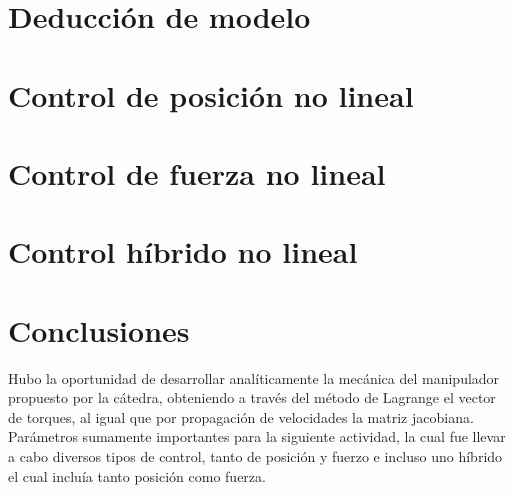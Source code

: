 




\setmainfont{AvenirLTStd-Roman}



\setmainfont{Calibri}


\tableofcontents
\newpage


\section{Deducción de modelo}


\section{Control de posición no lineal}


\section{Control de fuerza no lineal}


\section{Control híbrido no lineal}


\section{Conclusiones}
Hubo la oportunidad de desarrollar analíticamente la mecánica del manipulador propuesto por la cátedra, obteniendo a través del método de Lagrange el vector de torques, al igual que por propagación de velocidades la matriz jacobiana. Parámetros sumamente importantes para la siguiente actividad, la cual fue llevar a cabo diversos tipos de control, tanto de posición y fuerzo e incluso uno híbrido el cual incluía tanto posición como fuerza.

